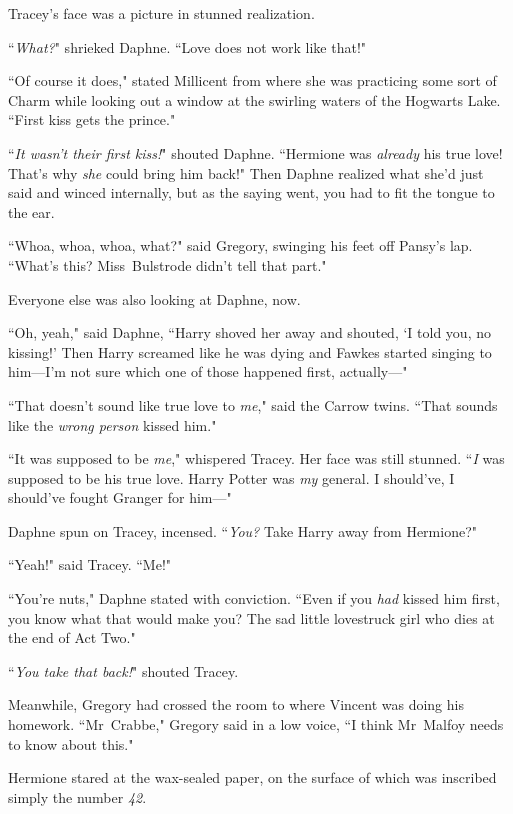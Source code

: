 Tracey's face was a picture in stunned realization.

``\emph{What?}" shrieked Daphne. ``Love does not work like that!"

``Of course it does," stated Millicent from where she was practicing some sort of Charm while looking out a window at the swirling waters of the Hogwarts Lake. ``First kiss gets the prince."

``\emph{It wasn't their first kiss!}" shouted Daphne. ``Hermione was \emph{already} his true love! That's why \emph{she} could bring him back!" Then Daphne realized what she'd just said and winced internally, but as the saying went, you had to fit the tongue to the ear.

``Whoa, whoa, whoa, what?" said Gregory, swinging his feet off Pansy's lap. ``What's this? Miss~Bulstrode didn't tell that part."

Everyone else was also looking at Daphne, now.

``Oh, yeah," said Daphne, ``Harry shoved her away and shouted, `I told you, no kissing!' Then Harry screamed like he was dying and Fawkes started singing to him—I'm not sure which one of those happened first, actually—"

``That doesn't sound like true love to \emph{me}," said the Carrow twins. ``That sounds like the \emph{wrong person} kissed him."

``It was supposed to be \emph{me}," whispered Tracey. Her face was still stunned. ``\emph{I} was supposed to be his true love. Harry Potter was \emph{my} general. I should've, I should've fought Granger for him—"

Daphne spun on Tracey, incensed. ``\emph{You?} Take Harry away from Hermione?"

``Yeah!" said Tracey. ``Me!"

``You're nuts," Daphne stated with conviction. ``Even if you \emph{had} kissed him first, you know what that would make you? The sad little lovestruck girl who dies at the end of Act Two."

``\emph{You take that back!}" shouted Tracey.

Meanwhile, Gregory had crossed the room to where Vincent was doing his homework. ``Mr~Crabbe," Gregory said in a low voice, ``I think Mr~Malfoy needs to know about this."


Hermione stared at the wax-sealed paper, on the surface of which was inscribed simply the number \emph{42}.

